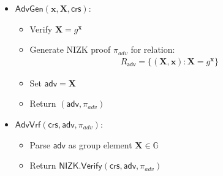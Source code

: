 \begin{itemize}
\item $\mathsf{AdvGen}(\mathbf{x}, \mathbf{X}, \mathsf{crs})$:
   \begin{itemize}
       \item Verify $\mathbf{X} = g^\mathbf{x}$ 
       \item Generate NIZK proof $\pi_{adv}$ for relation:
           \begin{align*}
           R_{\mathsf{adv}} = \{(\mathbf{X}, \mathbf{x}) : \mathbf{X} = g^\mathbf{x}\}
           \end{align*}
       \item Set $\mathsf{adv} = \mathbf{X}$
       \item Return $(\mathsf{adv}, \pi_{adv})$
   \end{itemize}

\item $\mathsf{AdvVrf}(\mathsf{crs}, \mathsf{adv}, \pi_{adv})$:
   \begin{itemize}
       \item Parse $\mathsf{adv}$ as group element $\mathbf{X} \in \mathbb{G}$
       \item Return $\mathsf{NIZK.Verify}(\mathsf{crs}, \mathsf{adv}, \pi_{adv})$
   \end{itemize}


\end{itemize}

